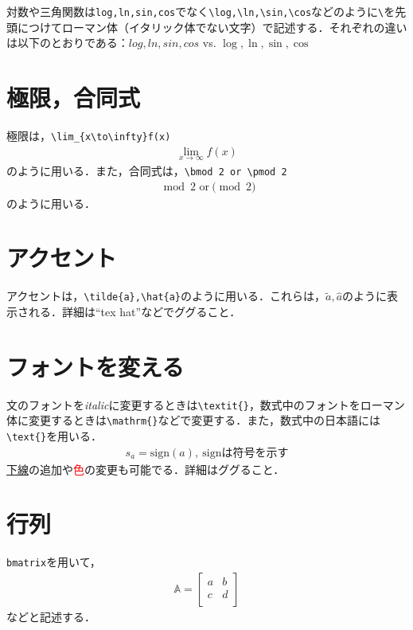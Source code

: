 \documentclass[11pt,a4paper]{jsarticle}
\begin{document}
対数や三角関数は\verb|log,ln,sin,cos|でなく\verb|\log,\ln,\sin,\cos|などのように\verb|\|を先頭につけてローマン体（イタリック体でない文字）で記述する．それぞれの違いは以下のとおりである：$log,ln,sin,cos$ vs. $\log,\ln,\sin,\cos$

\section{極限，合同式}

極限は，\verb|\lim_{x\to\infty}f(x)|
\begin{align*}
  \lim_{x\to\infty}f(x)
\end{align*}
のように用いる．また，合同式は，\verb|\bmod 2 or \pmod 2|
\begin{align*}
  \bmod 2 \text{~or} \pmod 2
\end{align*}
のように用いる．

\section{アクセント}

アクセントは，\verb|\tilde{a},\hat{a}|のように用いる．これらは，$\tilde{a},\hat{a}$のように表示される．詳細は``tex hat''などでググること．

\section{フォントを変える}

文のフォントを\textit{italic}に変更するときは\verb|\textit{}|，数式中のフォントをローマン体に変更するときは\verb|\mathrm{}|などで変更する．また，数式中の日本語には\verb|\text{}|を用いる．
\begin{align*}
  s_a = \mathrm{sign}(a),~\text{signは符号を示す}
\end{align*}
\underline{下線}の追加や\textcolor{red}{色}の変更も可能でる．詳細はググること．

\section{行列}

\verb|bmatrix|を用いて，
\begin{align*}
  \mathbb{A}=
  \begin{bmatrix}
    a & b \\
    c & d \\
  \end{bmatrix}
\end{align*}
などと記述する．
\end{document}
